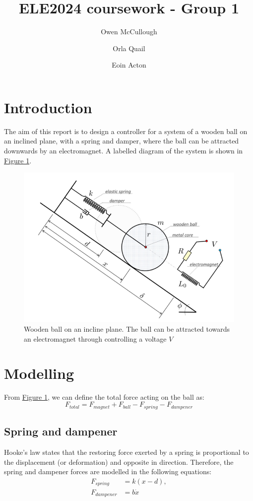 \documentclass[a4paper,10pt,reqno]{amsart}
\title[ELE2024 Coursework]{ELE2024 coursework - Group 1}
\author[O. McCullough]{Owen McCullough}
\author[O. Quail]{Orla Quail}
\author[E. Acton]{Eoin Acton}
\numberwithin{equation}{section}
\begin{document}
\maketitle

\section*{Introduction}
The aim of this report is to design a controller for a system of a wooden ball on an inclined plane, with a spring and damper, where the ball can be attracted downwards by an electromagnet.
A labelled diagram of the system is shown in \hyperref[fig:system]{Figure 1}.

\begin{figure}[h]
\centering
\includegraphics[width=0.6\linewidth]{ControlCW_sys_diagram.png}
\caption{Wooden ball on an incline plane. The ball can be attracted towards an electromagnet through controlling a voltage $V$}
\label{fig:system}
\end{figure}

\section{Modelling}
From \hyperref[fig:system]{Figure 1}, we can define the total force acting on the ball as:
\begin{equation}
\label{eq:total_F}
    F_{total}=F_{magnet}+F_{ball}-F_{spring}-F_{dampener}
\end{equation}

\subsection{Spring and dampener}
Hooke's law states that the restoring force exerted by a spring is proportional to the displacement (or deformation) and opposite in
direction. Therefore, the spring and dampener forces are modelled in the following equations:
\begin{subequations}
\label{eq:spring_dampener}
\begin{align}
    F_{spring}&=k(x-d), \\
    F_{dampener}&=b\dot x
\end{align}
\end{subequations}
\end{document}
